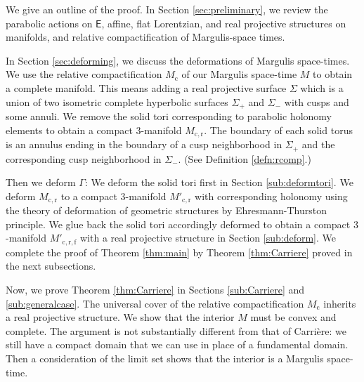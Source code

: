 \documentclass{amsart}
\numberwithin{equation}{section}
\newcommand\Lspace{\mathsf E}
\theoremstyle{definition}
\theoremstyle{remark}
\newcommand{\romec}{\mathrm{c}}
\newcommand{\romecr}{{\mathrm{c}, \mathrm{r}}}
\newcommand{\romecrf}{{\mathrm{c}, \mathrm{r}, \mathrm{f}}}
\begin{document}
We give an outline of the proof. 
In Section \ref{sec:preliminary}, we review 
the parabolic actions on $\Lspace$, affine, flat Lorentzian, 
and real projective structures on manifolds, 
and relative compactification of Margulis-space times. 

In Section \ref{sec:deforming}, we discuss 
the deformations of Margulis space-times. 
We use the relative compactification $M_{\romec}$ 
of our Margulis space-time $M$ to obtain a complete manifold. 
This means adding a real projective surface $\Sigma$ 
which is a union of two isometric 
complete hyperbolic surfaces $\Sigma_+$ and $\Sigma_-$ with cusps and some annuli. 
We remove the solid tori corresponding to parabolic holonomy elements 
to obtain a compact $3$-manifold $M_{\romecr}$.
The boundary of each solid torus is an annulus ending in the boundary of 
a cusp neighborhood in $\Sigma_+$ and the corresponding 
cusp neighborhood in $\Sigma_-$. 
(See Definition \ref{defn:rcomp}.)


Then we deform $\Gamma$:
We deform the solid tori  
first in Section \ref{sub:deformtori}. 
We deform $M_{\romecr}$ 
to a compact $3$-manifold $M'_{\romecr}$ with corresponding holonomy
using the theory of deformation of geometric structures by Ehresmann-Thurston principle. 
We glue back the solid tori accordingly deformed to obtain
a compact $3$-manifold $M'_{\romecrf}$ with a real projective structure
in Section \ref{sub:deform}. 
We complete the proof of Theorem \ref{thm:main} by 
Theorem \ref{thm:Carriere} proved in the next subsections.




Now, we prove Theorem \ref{thm:Carriere} in Sections \ref{sub:Carriere}
and \ref{sub:generalcase}.
The universal cover of the relative compactification $M_{\romec}$ 
inherits a real projective structure. 
We show that the interior $M$ must be convex 
and complete. 
The argument is not substantially different from that of Carri\`ere: 
we still have a compact domain that 
we can use in place of a fundamental domain. 
Then a consideration of the limit set shows that the interior is 
a Margulis space-time. 
\end{document}
